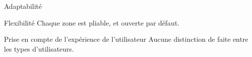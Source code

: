 \begin{frame}{Adaptabilité}

  \begin{block}{Flexibilité}
    Chaque zone est pliable, et ouverte par défaut.
  \end{block}

  \begin{block}{Prise en compte de l'expérience de l'utilisateur}
    Aucune distinction de faite entre les types d'utilisateurs.
  \end{block}

\end{frame}
